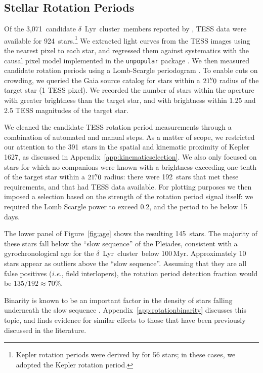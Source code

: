 \documentclass[12pt,modern,twocolumn,tighten]{aastex63}
\newcommand{\cn}{$\delta$\ Lyr\ cluster} %
\newcommand{\noriginal}{3{,}071} %
\newcommand{\nwithtess}{924} %
\newcommand{\nkinwithtess}{391} %
\newcommand{\nkinwithtessandcrowding}{192} %
\newcommand{\nkindefaultcleaning}{145} %
\newcommand{\nrotgood}{135} %
\newcommand{\nfracprot}{70} %
\begin{document}
\subsection{Stellar Rotation Periods}

Of the \noriginal\ candidate \cn\ members reported by
\citet{kounkel_untangling_2019}, TESS data were available for
\nwithtess\ stars.\footnote{Kepler rotation periods were derived by
\citet{mcquillan_rotation_2014} for 56 stars; in these cases, we
adopted the Kepler rotation period.  } We extracted light curves from
the TESS images using the nearest pixel to each star, and regressed
them against systematics with the causal pixel model implemented in
the \texttt{unpopular} package \citep{hattorio_2021_cpm}.  We then
measured candidate rotation periods using a Lomb-Scargle periodogram
\citep{lomb_1976,scargle_studies_1982,astropy_2018}.  To enable cuts
on crowding, we queried the Gaia source catalog for stars within a
$21\mbox{$.\!\!^{\prime\prime}$}0$ radius of the target star (1 TESS pixel).  We recorded the
number of stars within the aperture with greater brightness than the
target star, and with brightness within 1.25 and 2.5 TESS magnitudes
of the target star.  

We cleaned the candidate TESS rotation period measurements through a
combination of automated and manual steps.  As a matter of scope, we
restricted our attention to the \nkinwithtess\ stars in the spatial
and kinematic proximity of Kepler\,1627, as discussed in
Appendix~\ref{app:kinematicselection}.  We also only focused on stars
for which no companions were known with a brightness exceeding
one-tenth of the target star within a $21\mbox{$.\!\!^{\prime\prime}$}0$ radius: there were
\nkinwithtessandcrowding\ stars that met these requirements, and that
had TESS data available.  For plotting purposes we then imposed a
selection based on the strength of the rotation period signal itself:
we required the Lomb Scargle power to exceed 0.2, and the period to be
below 15\,days.

The lower panel of Figure~\ref{fig:age} shows the resulting
\nkindefaultcleaning\ stars.  The majority of these stars fall below
the ``slow sequence'' of the Pleiades, consistent with a
gyrochronological age for the \cn\ below 100\,Myr.  Approximately 10
stars appear as outliers above the ``slow sequence''.  Assuming that
they are all false positives ({\it i.e.}, field interlopers), the
rotation period detection fraction would be
$\nrotgood/\nkinwithtessandcrowding \approx \nfracprot\%$.

Binarity is known to be an important factor in the density of stars
falling underneath the slow sequence
\citep{meibom_effect_2007,gillen_ngts_2020,bouma_2021_ngc2516}.
Appendix~\ref{app:rotationbinarity} discusses this topic, and finds
evidence for similar effects to those that have been previously
discussed in the literature.
\end{document}
